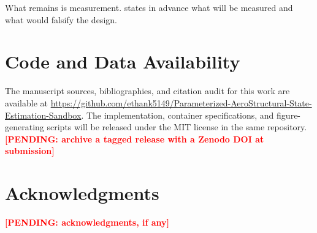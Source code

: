 \documentclass[11pt,a4paper]{article}
\theoremstyle{definition}
\numberwithin{equation}{section}
\newcommand{\PENDING}[1]{\textcolor{red}{\textbf{[PENDING: #1]}}}
\begin{document}
What remains is measurement.  states in advance what will be measured and what would falsify the design.

\section*{Code and Data Availability}

The manuscript sources, bibliographies, and citation audit for this work are available at \url{https://github.com/ethank5149/Parameterized-AeroStructural-State-Estimation-Sandbox}. The implementation, container specifications, and figure-generating scripts will be released under the MIT license in the same repository. \PENDING{archive a tagged release with a Zenodo DOI at submission}

\section*{Acknowledgments}

\PENDING{acknowledgments, if any}

\pagebreak

\printbibliography
{}

\pagebreak
\end{document}
